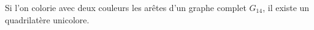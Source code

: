 Si l'on colorie avec deux couleurs les arêtes d'un graphe complet $G_{14}$, il existe un quadrilatère unicolore.
